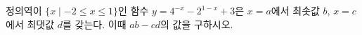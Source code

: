 정의역이 $\{x\mid -2\le x\le 1\}$인 함수 $y=4^{-x}-2^{1-x}+3$은 $x=a$에서 최솟값 $b$, $x=c$에서 최댓값 $d$를 갖는다. 이때 $ab-cd$의 값을 구하시오.
